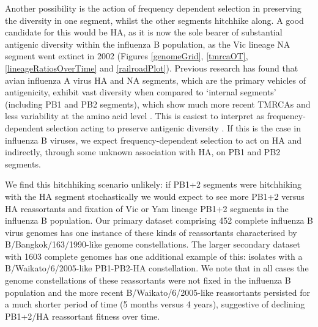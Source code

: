 \documentclass[11pt,oneside,letterpaper]{article}
\begin{document}
Another possibility is the action of frequency dependent selection in preserving the diversity in one segment, whilst the other segments hitchhike along.
A good candidate for this would be HA, as it is now the sole bearer of substantial antigenic diversity within the influenza B population, as the Vic lineage NA segment went extinct in 2002 (Figures \ref{genomeGrid}, \ref{tmrcaOT}, \ref{lineageRatiosOverTime} and \ref{railroadPlot}).
Previous research has found that avian influenza A virus HA and NA segments, which are the primary vehicles of antigenicity, exhibit vast diversity when compared to `internal segments' (including PB1 and PB2 segments), which show much more recent TMRCAs and less variability at the amino acid level \citep{chen2006,obenauer2006}.
This is easiest to interpret as frequency-dependent selection acting to preserve antigenic diversity \citep{worobey2014}.
If this is the case in influenza B viruses, we expect frequency-dependent selection to act on HA and indirectly, through some unknown association with HA, on PB1 and PB2 segments.

We find this hitchhiking scenario unlikely: if PB1+2 segments were hitchhiking with the HA segment stochastically we would expect to see more PB1+2 versus HA reassortants and fixation of Vic or Yam lineage PB1+2 segments in the influenza B population.
Our primary dataset comprising 452 complete influenza B virus genomes has one instance of these kinds of reassortants characterised by B/Bangkok/163/1990-like genome constellations.
The larger secondary dataset with 1603 complete genomes has one additional example of this: isolates with a B/Waikato/6/2005-like PB1-PB2-HA constellation.
We note that in all cases the genome constellations of these reassortants were not fixed in the influenza B population and the more recent B/Waikato/6/2005-like reassortants persisted for a much shorter period of time (5 months versus 4 years), suggestive of declining PB1+2/HA reassortant fitness over time.
\end{document}
